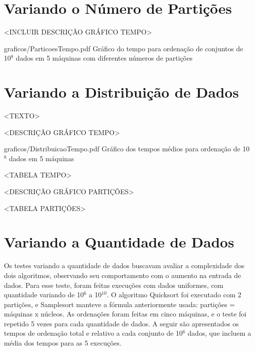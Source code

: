 \section{Variando o Número de Partições}

<INCLUIR DESCRIÇÃO GRÁFICO TEMPO>
 
\begin{defaultFigure}{0.75\textwidth}{graficos/ParticoesTempo.pdf}
{Gráfico do tempo para ordenação de conjuntos de 10$^8$ dados em 5 máquinas com diferentes números
de partições}
\label{fig:ParticoesTempo}
\end{defaultFigure}

\newpage
\section{Variando a Distribuição de Dados}

<TEXTO> 

<DESCRIÇÃO GRÁFICO TEMPO>
\begin{defaultFigure}{0.75\textwidth}{graficos/DistribuicaoTempo.pdf}
{Gráfico dos tempos médios para ordenação de 10$^8$ dados em 5 máquinas}
\label{fig:DadosTempos}
\end{defaultFigure}

<TABELA TEMPO>

<DESCRIÇÃO GRÁFICO PARTIÇÕES>

<TABELA PARTIÇÕES>


\newpage
\section{Variando a Quantidade de Dados}

Os testes variando a quantidade de dados buscavam avaliar a complexidade dos dois algoritmos,
observando seu comportamento com o aumento na entrada de dados. Para esse teste, foram feitas
execuções com dados uniformes, com quantidade variando de 10$^6$ a 10$^{10}$. 
O algoritmo Quicksort foi executado com 2 partições, e Samplesort manteve a fórmula anteriormente
usada: partições = máquinas x núcleos. As ordenações
foram feitas em cinco máquinas, e o teste foi repetido 5 vezes para cada quantidade de
dados. 
A seguir são apresentados os tempos de ordenação total e relativo a cada conjunto de 10$^6$ dados,
que incluem a média dos tempos para as 5 execuções.


